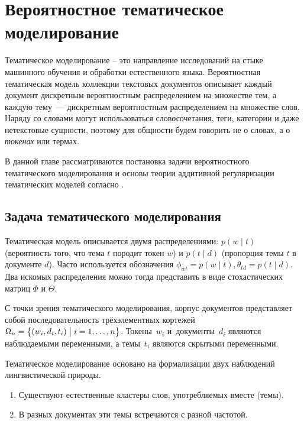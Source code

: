 \chapter{Вероятностное тематическое моделирование}

Тематическое моделирование – это направление исследований на стыке машинного обучения и обработки естественного языка. Вероятностная тематическая модель коллекции текстовых документов описывает каждый документ дискретным вероятностным распределением на множестве тем, а каждую тему~--- дискретным вероятностным распределением на множестве слов. Наряду со словами могут использоваться словосочетания, теги, категории и даже нетекстовые сущности, поэтому для общности будем говорить не о словах, а о \textit{токенах} или термах.

В данной главе рассматриваются постановка задачи вероятностного тематического моделирования и основы теории аддитивной регуляризации тематических моделей согласно \cite{vorontsov2014additive,kochedykov2017fast}.

\section{Задача тематического моделирования}


Тематическая модель описывается двумя распределениями: $p(w \mid t)$ (вероятность того, что тема $t$ породит токен $w$) и $p(t \mid d)$ (пропорция темы $t$ в документе $d$). Часто используется обозначения $\phi_{wt} = p(w \mid t), \theta_{td} = p(t \mid d)$. Два искомых распределения можно тогда представить в виде стохастических матриц $\Phi$ и $\Theta$.

С точки зрения тематического моделирования, корпус документов представляет собой последовательность трёхэлементных кортежей ${\Omega_n = \bigl\{ (w_i,d_i,t_i) \bigm| i=1,\dots,n \bigr\}}$.
Токены~$w_i$ и~документы~$d_i$ являются наблюдаемыми переменными,
а темы~$t_i$ являются скрытыми переменными.

Тематическое моделирование основано на формализации двух наблюдений лингвистической природы.
\begin{enumerate}
\item{Существуют естественные кластеры слов, употребляемых вместе (темы).}
\item{В разных документах эти темы встречаются с разной частотой.}
\end{enumerate}

